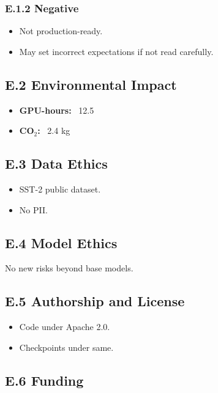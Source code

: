 \subsubsection{E.1.2 Negative}

\begin{itemize}
\item Not production-ready.
\item May set incorrect expectations if not read carefully.

\end{itemize}
\subsection{E.2 Environmental Impact}

\begin{itemize}
\item \textbf{GPU-hours:} ~12.5
\item \textbf{CO$_2$:} ~2.4 kg

\end{itemize}
\subsection{E.3 Data Ethics}

\begin{itemize}
\item SST-2 public dataset.
\item No PII.

\end{itemize}
\subsection{E.4 Model Ethics}

No new risks beyond base models.

\subsection{E.5 Authorship and License}

\begin{itemize}
\item Code under Apache 2.0.
\item Checkpoints under same.

\end{itemize}
\subsection{E.6 Funding}


